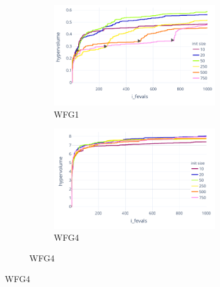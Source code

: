     \begin{figure}[!h]
        \centering
        \begin{subfigure}{\textwidth}
            \begin{subfigure}{0.45\textwidth}
                \includegraphics[width=\textwidth]{content/images/hypermapper_wfg1_start_set}
                \caption{WFG1}
                \label{fig:hmapper_wfg1_start_set}
            \end{subfigure}
            \begin{subfigure}{0.45\textwidth}
                \includegraphics[width=\textwidth]{content/images/hypermapper_wfg4_start_set}
                \caption{WFG4}
                \label{fig:hmapper_wfg4_start_set}
            \end{subfigure}
        \end{subfigure} 
        \hfill


\end{figure}
